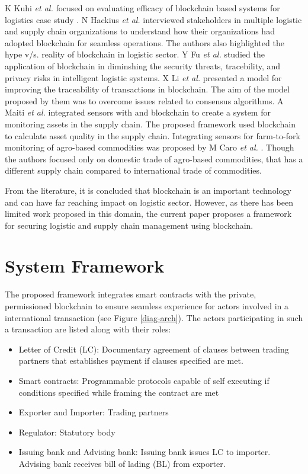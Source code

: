 \documentclass[num-refs]{wiley-article}
\begin{document}
K Kuhi \textit{et al.} focused on evaluating efficacy of blockchain based systems for logistics case study  \cite{kuhi2018ensuring}. N Hackius \textit{et al.} \cite{hackius2020translating} interviewed stakeholders in multiple logistic and supply chain organizations to understand how their organizations had adopted blockchain for seamless operations. The authors also highlighted the hype v/s. reality of blockchain in logistic sector. Y Fu \textit{et al.} \cite{fu2019operation} studied the application of blockchain in diminshing the security threats, tracebility, and privacy risks in intelligent logistic systems. X Li \textit{et al.} \cite{li2020research} presented a model for improving the traceability of transactions in blockchain. The aim of the model proposed by them was to overcome issues related to consensus algorithms. A Maiti \textit{et al.} \cite{maiti2019estimating} integrated sensors with and blockchain to create a system for monitoring assets in the supply chain. The proposed framework used blockchain to calculate asset quality in the supply chain. Integrating sensors for farm-to-fork monitoring of agro-based commodities was proposed by M Caro \textit{et al.} \cite{caro2018blockchain}. Though the authors focused only on domestic trade of agro-based commodities, that has a different supply chain compared to international trade of commodities.


From the literature, it is concluded that blockchain is an important technology and can have far reaching impact on logistic sector. However, as there has been limited work proposed in this domain, the current paper proposes a framework for securing logistic and supply chain management using blockchain.

\section{System Framework} \label{prop}
The proposed framework integrates smart contracts with the private, permissioned blockchain to ensure seamless experience for actors involved in a international transaction (see Figure \ref{diag-arch}). The actors participating in such a transaction are listed along with their roles:

\begin{itemize}
    \item Letter of Credit (LC): Documentary agreement of clauses between trading partners that establishes payment if clauses specified are met.
    \item Smart contracts: Programmable protocols capable of self executing if conditions specified while framing the contract are met
    \item Exporter and Importer: Trading partners
    \item Regulator: Statutory body
    \item Issuing bank and Advising bank: Issuing bank issues LC to importer. Advising bank receives bill of lading (BL) from exporter.
\end{itemize}
\end{document}
